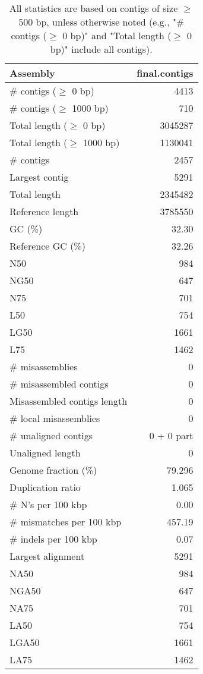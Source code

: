 \documentclass[12pt,a4paper]{article}
\begin{document}
\begin{table}[ht]
\begin{center}
\caption{All statistics are based on contigs of size $\geq$ 500 bp, unless otherwise noted (e.g., "\# contigs ($\geq$ 0 bp)" and "Total length ($\geq$ 0 bp)" include all contigs).}
\begin{tabular}{|l*{1}{|r}|}
\hline
Assembly & final.contigs \\ \hline
\# contigs ($\geq$ 0 bp) & 4413 \\ \hline
\# contigs ($\geq$ 1000 bp) & 710 \\ \hline
Total length ($\geq$ 0 bp) & 3045287 \\ \hline
Total length ($\geq$ 1000 bp) & 1130041 \\ \hline
\# contigs & 2457 \\ \hline
Largest contig & 5291 \\ \hline
Total length & 2345482 \\ \hline
Reference length & 3785550 \\ \hline
GC (\%) & 32.30 \\ \hline
Reference GC (\%) & 32.26 \\ \hline
N50 & 984 \\ \hline
NG50 & 647 \\ \hline
N75 & 701 \\ \hline
L50 & 754 \\ \hline
LG50 & 1661 \\ \hline
L75 & 1462 \\ \hline
\# misassemblies & 0 \\ \hline
\# misassembled contigs & 0 \\ \hline
Misassembled contigs length & 0 \\ \hline
\# local misassemblies & 0 \\ \hline
\# unaligned contigs & 0 + 0 part \\ \hline
Unaligned length & 0 \\ \hline
Genome fraction (\%) & 79.296 \\ \hline
Duplication ratio & 1.065 \\ \hline
\# N's per 100 kbp & 0.00 \\ \hline
\# mismatches per 100 kbp & 457.19 \\ \hline
\# indels per 100 kbp & 0.07 \\ \hline
Largest alignment & 5291 \\ \hline
NA50 & 984 \\ \hline
NGA50 & 647 \\ \hline
NA75 & 701 \\ \hline
LA50 & 754 \\ \hline
LGA50 & 1661 \\ \hline
LA75 & 1462 \\ \hline
\end{tabular}
\end{center}
\end{table}
\end{document}

